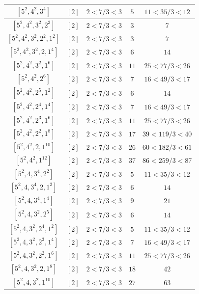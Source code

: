 \documentclass{article}%
\begin{document}
\begin{center}
\begin{longtable}{||c|c|c|c|c||}
$[5^{2}, 4^{2}, 3^{4}]$ & $[2]$ & $2 < 7/3 < 3$ & $5$ & $11 < 35/3 < 12$ \\ \hline 
$[5^{2}, 4^{2}, 3^{2}, 2^{3}]$ & $[2]$ & $2 < 7/3 < 3$ & $3$ & $7$ \\ \hline 
$[5^{2}, 4^{2}, 3^{2}, 2^{2}, 1^{2}]$ & $[2]$ & $2 < 7/3 < 3$ & $3$ & $7$ \\ \hline 
$[5^{2}, 4^{2}, 3^{2}, 2, 1^{4}]$ & $[2]$ & $2 < 7/3 < 3$ & $6$ & $14$ \\ \hline 
$[5^{2}, 4^{2}, 3^{2}, 1^{6}]$ & $[2]$ & $2 < 7/3 < 3$ & $11$ & $25 < 77/3 < 26$ \\ \hline 
$[5^{2}, 4^{2}, 2^{6}]$ & $[2]$ & $2 < 7/3 < 3$ & $7$ & $16 < 49/3 < 17$ \\ \hline 
$[5^{2}, 4^{2}, 2^{5}, 1^{2}]$ & $[2]$ & $2 < 7/3 < 3$ & $6$ & $14$ \\ \hline 
$[5^{2}, 4^{2}, 2^{4}, 1^{4}]$ & $[2]$ & $2 < 7/3 < 3$ & $7$ & $16 < 49/3 < 17$ \\ \hline 
$[5^{2}, 4^{2}, 2^{3}, 1^{6}]$ & $[2]$ & $2 < 7/3 < 3$ & $11$ & $25 < 77/3 < 26$ \\ \hline 
$[5^{2}, 4^{2}, 2^{2}, 1^{8}]$ & $[2]$ & $2 < 7/3 < 3$ & $17$ & $39 < 119/3 < 40$ \\ \hline 
$[5^{2}, 4^{2}, 2, 1^{10}]$ & $[2]$ & $2 < 7/3 < 3$ & $26$ & $60 < 182/3 < 61$ \\ \hline 
$[5^{2}, 4^{2}, 1^{12}]$ & $[2]$ & $2 < 7/3 < 3$ & $37$ & $86 < 259/3 < 87$ \\ \hline 
$[5^{2}, 4, 3^{4}, 2^{2}]$ & $[2]$ & $2 < 7/3 < 3$ & $5$ & $11 < 35/3 < 12$ \\ \hline 
$[5^{2}, 4, 3^{4}, 2, 1^{2}]$ & $[2]$ & $2 < 7/3 < 3$ & $6$ & $14$ \\ \hline 
$[5^{2}, 4, 3^{4}, 1^{4}]$ & $[2]$ & $2 < 7/3 < 3$ & $9$ & $21$ \\ \hline 
$[5^{2}, 4, 3^{2}, 2^{5}]$ & $[2]$ & $2 < 7/3 < 3$ & $6$ & $14$ \\ \hline 
$[5^{2}, 4, 3^{2}, 2^{4}, 1^{2}]$ & $[2]$ & $2 < 7/3 < 3$ & $5$ & $11 < 35/3 < 12$ \\ \hline 
$[5^{2}, 4, 3^{2}, 2^{3}, 1^{4}]$ & $[2]$ & $2 < 7/3 < 3$ & $7$ & $16 < 49/3 < 17$ \\ \hline 
$[5^{2}, 4, 3^{2}, 2^{2}, 1^{6}]$ & $[2]$ & $2 < 7/3 < 3$ & $11$ & $25 < 77/3 < 26$ \\ \hline 
$[5^{2}, 4, 3^{2}, 2, 1^{8}]$ & $[2]$ & $2 < 7/3 < 3$ & $18$ & $42$ \\ \hline 
$[5^{2}, 4, 3^{2}, 1^{10}]$ & $[2]$ & $2 < 7/3 < 3$ & $27$ & $63$ \\ \hline 

\end{longtable}
\end{center}
\end{document}
